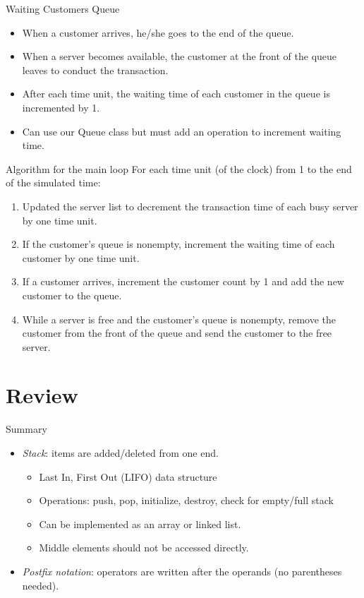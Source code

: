 \documentclass[14pt,aspectratio=1610]{beamer}
\begin{document}
\begin{frame}{Waiting Customers Queue}
  \begin{itemize}
    \item 
      When a customer arrives, he/she goes to the end of the queue.
    \item 
      When a server becomes available, the customer at the front of the queue leaves to conduct the transaction.
    \item 
      After each time unit, the waiting time of each customer in the queue is incremented by 1.
    \item 
      Can use our Queue class but must add an operation to increment waiting time.
  \end{itemize}
\end{frame}

\begin{frame}{Algorithm for the main loop}
  For each time unit (of the clock) from 1 to the end of the simulated time:
  \begin{enumerate}
    \item 
      Updated the server list to decrement the transaction time of each busy server by one time unit.
    \item 
      If the customer's queue is nonempty, increment the waiting time of each customer by one time unit.
    \item 
      If a customer arrives, increment the customer count by 1 and add the new customer to the queue.
    \item 
      While a server is free and the customer's queue is nonempty, remove the customer from the front of the queue and send the customer to the free server.
  \end{enumerate}
\end{frame}

\section{Review}

\begin{frame}{Summary}
\begin{itemize}
\item
  \emph{Stack}: items are added/deleted from one end.
  \begin{itemize}
  \item
    Last In, First Out (LIFO) data structure
  \item
    Operations: push, pop, initialize, destroy, check for empty/full stack
  \item
    Can be implemented as an array or linked list.
  \item
    Middle elements should not be accessed directly.
  \end{itemize}
\item
  \emph{Postfix notation}: operators are written after the operands (no parentheses needed).
\end{itemize}
\end{frame}
\end{document}
